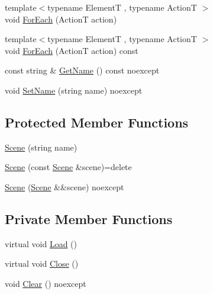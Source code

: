 \begin{DoxyCompactItemize}
\item 
{\footnotesize template$<$typename ElementT , typename ActionT $>$ }\\void \hyperlink{classmage_1_1_scene_a72998c69cf486d1f2671a2570b2f8905}{For\+Each} (ActionT action)
\item 
{\footnotesize template$<$typename ElementT , typename ActionT $>$ }\\void \hyperlink{classmage_1_1_scene_a839971fb614f9bb669ddb511173740dc}{For\+Each} (ActionT action) const
\item 
const string \& \hyperlink{classmage_1_1_scene_a6afd25c30d08eb579eb430af49cf8fc0}{Get\+Name} () const noexcept
\item 
void \hyperlink{classmage_1_1_scene_ae5e0a4daa62322ff18d673944ad4e0e8}{Set\+Name} (string name) noexcept
\end{DoxyCompactItemize}
\subsection*{Protected Member Functions}
\begin{DoxyCompactItemize}
\item 
\hyperlink{classmage_1_1_scene_aaed505892f2a639db47e5d5767f41337}{Scene} (string name)
\item 
\hyperlink{classmage_1_1_scene_a88d83ccb2e10549d5370f850b2b4c228}{Scene} (const \hyperlink{classmage_1_1_scene}{Scene} \&scene)=delete
\item 
\hyperlink{classmage_1_1_scene_afeae10a3a50bf1d624faa6bd0bf33a7d}{Scene} (\hyperlink{classmage_1_1_scene}{Scene} \&\&scene) noexcept
\end{DoxyCompactItemize}
\subsection*{Private Member Functions}
\begin{DoxyCompactItemize}
\item 
virtual void \hyperlink{classmage_1_1_scene_a472443b059c8be0fcd223f6df8378934}{Load} ()
\item 
virtual void \hyperlink{classmage_1_1_scene_afcdedaac5ecab7dcbbb180426054aaa5}{Close} ()
\item 
void \hyperlink{classmage_1_1_scene_adf4a5b3885e34336caa5f145f55e01e1}{Clear} () noexcept
\end{DoxyCompactItemize}
